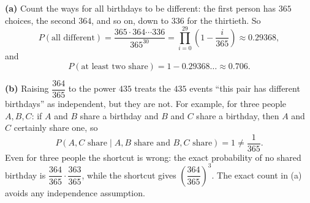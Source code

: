 \textbf{(a)} Count the ways for all birthdays to be different: the first person has $365$ choices, the second $364$, and so on, down to $336$ for the thirtieth. So
\[P(\text{all different})=\dfrac{365\cdot364\cdots336}{365^{30}}=\prod_{i=0}^{29}\left(1-\dfrac{i}{365}\right)\approx0.29368,\]
and
\[P(\text{at least two share})=1-0.29368\ldots\approx\boxed{0.706}.\]

\textbf{(b)} Raising $\dfrac{364}{365}$ to the power $435$ treats the $435$ events ``this pair has different birthdays'' as independent, but they are not. For example, for three people $A,B,C$: if $A$ and $B$ share a birthday and $B$ and $C$ share a birthday, then $A$ and $C$ certainly share one, so
\[P(A,C\text{ share}\mid A,B\text{ share and }B,C\text{ share})=1\ne\dfrac1{365}.\]
Even for three people the shortcut is wrong: the exact probability of no shared birthday is $\dfrac{364}{365}\cdot\dfrac{363}{365}$, while the shortcut gives $\left(\dfrac{364}{365}\right)^3$. The exact count in (a) avoids any independence assumption.
